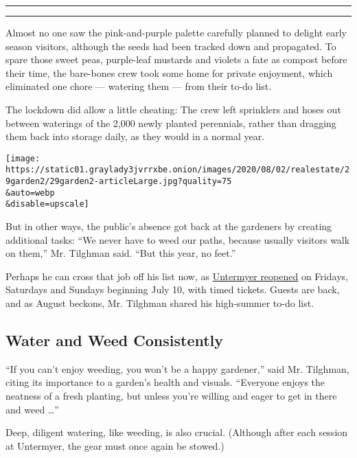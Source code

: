 \begin{center}\rule{0.5\linewidth}{\linethickness}\end{center}

\begin{center}\rule{0.5\linewidth}{\linethickness}\end{center}

Almost no one saw the pink-and-purple palette carefully planned to
delight early season visitors, although the seeds had been tracked down
and propagated. To spare those sweet peas, purple-leaf mustards and
violets a fate as compost before their time, the bare-bones crew took
some home for private enjoyment, which eliminated one chore --- watering
them --- from their to-do list.

The lockdown did allow a little cheating: The crew left sprinklers and
hoses out between waterings of the 2,000 newly planted perennials,
rather than dragging them back into storage daily, as they would in a
normal year.

\texttt{[image: https://static01.graylady3jvrrxbe.onion/images/2020/08/02/realestate/29garden2/29garden2-articleLarge.jpg?quality=75\\\&auto=webp\\\&disable=upscale]}

But in other ways, the public's absence got back at the gardeners by
creating additional tasks: ``We never have to weed our paths, because
usually visitors walk on them,'' Mr. Tilghman said. ``But this year, no
feet.''

Perhaps he can cross that job off his list now, as
\href{https://www.untermyergardens.org/visit.html}{Untermyer reopened}
on Fridays, Saturdays and Sundays beginning July 10, with timed tickets.
Guests are back, and as August beckons, Mr. Tilghman shared his
high-summer to-do list.

\hypertarget{water-and-weed-consistently}{%
\subsection{Water and Weed
Consistently}\label{water-and-weed-consistently}}

``If you can't enjoy weeding, you won't be a happy gardener,'' said Mr.
Tilghman, citing its importance to a garden's health and visuals.
``Everyone enjoys the neatness of a fresh planting, but unless you're
willing and eager to get in there and weed \ldots{}''

Deep, diligent watering, like weeding, is also crucial. (Although after
each session at Untermyer, the gear must once again be stowed.)

